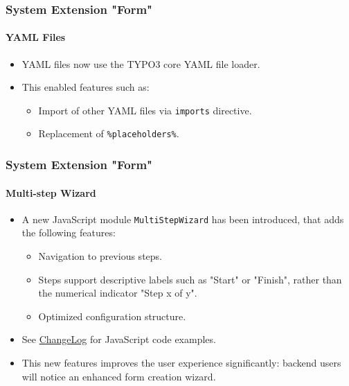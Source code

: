
\begin{frame}[fragile]
	\frametitle{System Extension "Form"}
	\framesubtitle{YAML Files}

	\begin{itemize}
		\item YAML files now use the TYPO3 core YAML file loader.
		\item This enabled features such as:

			\begin{itemize}
				\item Import of other YAML files via \texttt{imports} directive.
				\item Replacement of \texttt{\%placeholders\%}.
			\end{itemize}

	\end{itemize}

\end{frame}


\begin{frame}[fragile]
	\frametitle{System Extension "Form"}
	\framesubtitle{Multi-step Wizard}

	\begin{itemize}
		\item A new JavaScript module \texttt{MultiStepWizard} has been introduced,
			that adds the following features:

			\begin{itemize}
				\item Navigation to previous steps.
				\item Steps support descriptive labels such as "Start" or "Finish", rather than the numerical indicator "Step x of y".
				\item Optimized configuration structure.
			\end{itemize}

		\item See \href{https://docs.typo3.org/c/typo3/cms-core/master/en-us/Changelog/10.2/Feature-79445-AddMultistepWizard.html}{ChangeLog}
			for JavaScript code examples.

		\item This new features improves the user experience significantly: backend users will notice an enhanced form creation wizard.

	\end{itemize}

\end{frame}

